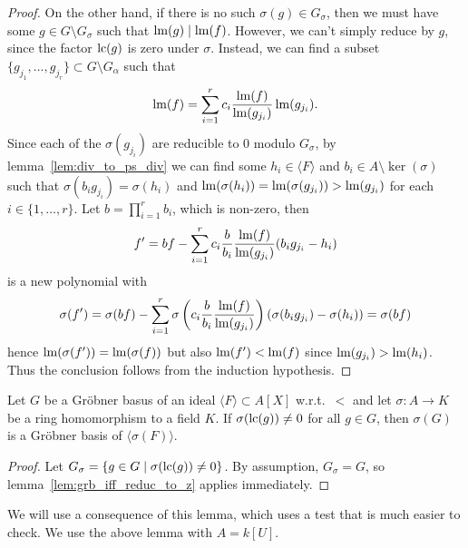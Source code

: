 \begin{proof}
  On the other hand, if there is no such $\sigma(g) \in G_{\sigma}$, then we must have some $g \in G \setminus G_{\sigma}$ such that $\operatorname{lm}(g) \mid \operatorname{lm}(f)$. However, we can't simply reduce by $g$, since the factor $\operatorname{lc}(g)$ is zero under $\sigma$. Instead, we can find a subset $\{g_{j_{1}}, \dots, g_{j_{r}}\} \subset G \setminus G_{\alpha}$ such that \[\operatorname{lm}(f) = \sum_{i = 1}^{r} c_{i} \frac{\operatorname{lm}(f)}{\operatorname{lm}(g_{j_{i}})} \operatorname{lm}(g_{j_{i}}).\]
  Since each of the $\sigma(g_{j_{i}})$ are reducible to 0 modulo $G_{\sigma}$, by lemma~\ref{lem:div_to_ps_div} we can find some $h_{i} \in \langle F \rangle$ and $b_{i} \in A \setminus \ker(\sigma)$ such that $\sigma(b_{i} g_{j_{i}}) = \sigma(h_{i})$ and $\operatorname{lm}(\sigma(h_{i})) = \operatorname{lm}(\sigma(g_{j_{i}})) > \operatorname{lm}(g_{j_{i}})$ for each $i \in \{1, \dots, r\}$. Let $b = \prod_{i = 1}^{r} b_{i}$, which is non-zero, then
  \[f' = b f - \sum_{i = 1}^{r} c_{i} \frac{b}{b_{i}} \frac{\operatorname{lm}(f)}{\operatorname{lm}(g_{j_{i}})}(b_{i}g_{j_{i}} - h_{i})\]
  is a new polynomial with
  \[\sigma(f') = \sigma(b f) - \sum_{i = 1}^{r} \sigma\left(c_{i} \frac{b}{b_{i}} \frac{\operatorname{lm}(f)}{\operatorname{lm}(g_{j_{i}})}\right) (\sigma(b_{i} g_{j_{i}}) - \sigma(h_{i})) = \sigma(b f)\]
  hence $\operatorname{lm}(\sigma(f')) = \operatorname{lm}(\sigma(f))$ but also $\operatorname{lm}(f') < \operatorname{lm}(f)$ since $\operatorname{lm}(g_{j_{i}}) > \operatorname{lm}(h_{i})$. Thus the conclusion follows from the induction hypothesis.
\end{proof}

\begin{corollary}\label{cor:grb_if_nmap_to_z}
  Let $G$ be a Gröbner basus of an ideal $\langle F \rangle \subset A[X]$ w.r.t.\ $<$ and let $\sigma : A \to K$ be a ring homomorphism to a field $K$. If $\sigma(\operatorname{lc}(g)) \neq 0$ for all $g \in G$, then $\sigma(G)$ is a Gröbner basis of $\langle \sigma(F) \rangle$.
\end{corollary}
\begin{proof}
  Let $G_{\sigma} = \{g \in G \mid \sigma(\operatorname{lc}(g)) \neq 0\}$. By assumption, $G_{\sigma} = G$, so lemma~\ref{lem:grb_iff_reduc_to_z} applies immediately.
\end{proof}


We will use a consequence of this lemma, which uses a test that is much easier to check. We use the above lemma with $A = k[U]$.

